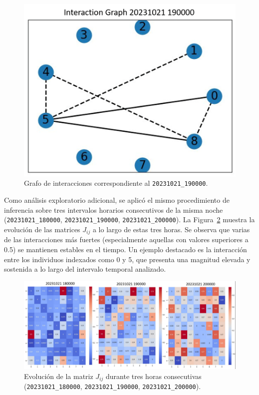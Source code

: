 \begin{figure}[ht]
    \centering
    \includegraphics[width=0.7\linewidth]{Graphics/corr_graph.png}
    \caption{Grafo de interacciones correspondiente al \texttt{20231021\_190000}.}
    \label{fig:graph}
\end{figure}

Como análisis exploratorio adicional, se aplicó el mismo 
procedimiento de inferencia sobre tres intervalos horarios 
consecutivos de la misma noche (\texttt{20231021\_180000}, \texttt{20231021\_190000}, \texttt{20231021\_200000}). 
La Figura~\ref{fig:jij_evol} 
muestra la evolución de las matrices \( J_{ij} \) a lo largo 
de estas tres horas. Se observa que varias de las interacciones 
más fuertes (especialmente aquellas con valores superiores a 
0.5) se mantienen estables en el tiempo. Un ejemplo destacado es 
la interacción entre los individuos indexados como 0 y 5, que 
presenta una magnitud elevada y sostenida a lo largo del 
intervalo temporal analizado.

\begin{figure}[ht]
    \centering
    \includegraphics[width=\columnwidth]{Graphics/3_matrixs.jpg}
    \caption{Evolución de la matriz \( J_{ij} \) durante tres horas consecutivas (\texttt{20231021\_180000}, \texttt{20231021\_190000}, \texttt{20231021\_200000}).}
    \label{fig:jij_evol}
\end{figure}

